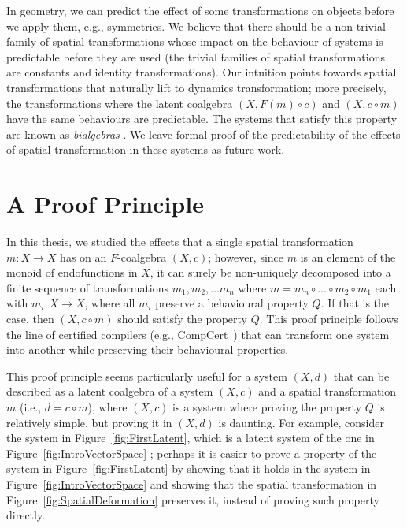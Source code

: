 In geometry, we can predict the effect of some transformations on objects before we apply them, e.g., symmetries. We believe that there should be a non-trivial family of spatial transformations whose impact on the behaviour of systems is predictable before they are used (the trivial families of spatial transformations are constants and identity transformations). Our intuition points towards spatial transformations that naturally lift to dynamics transformation; more precisely, the transformations where the latent coalgebra $(X, F(m)\circ c)$ and $(X,c\circ m)$ have the same behaviours are predictable. The systems that satisfy this property are known as \emph{bialgebras} \cite{JacobsBook}. We leave formal proof of the predictability of the effects of spatial transformation in these systems as future work.

\section{A Proof Principle}
In this thesis, we studied the effects that a single spatial transformation $m\colon X\rightarrow X$ has on an $F$-coalgebra $(X,c)$; however, since $m$ is an element of the monoid of endofunctions in $X$, it can surely be non-uniquely decomposed into a finite sequence of transformations $m_1, m_2, \ldots m_n$ where $m=m_n\circ\ldots \circ m_2\circ m_1$ each with $m_i\colon X\rightarrow X$, where all $m_i$ preserve a behavioural property $Q$. If that is the case, then $(X,c\circ m)$ should satisfy the property $Q$. This proof principle follows the line of certified compilers (e.g., CompCert~\cite{CompCert}) that can transform one system into another while preserving their behavioural properties.

This proof principle seems particularly useful for a system $(X,d)$ that can be described as a latent coalgebra of a system $(X,c)$ and a spatial transformation $m$ (i.e., $d=c\circ m$), where $(X,c)$ is a system where proving the property $Q$ is relatively simple, but proving it in $(X,d)$ is daunting. 
For example, consider the system in Figure~\ref{fig:FirstLatent}, which is a latent system of the one in Figure~\ref{fig:IntroVectorSpace}%
; perhaps it is easier to prove a property of the system in Figure~\ref{fig:FirstLatent} by showing that it holds in the system in Figure~\ref{fig:IntroVectorSpace} and showing that the spatial transformation in Figure~\ref{fig:SpatialDeformation} preserves it, instead of proving such property directly. 

